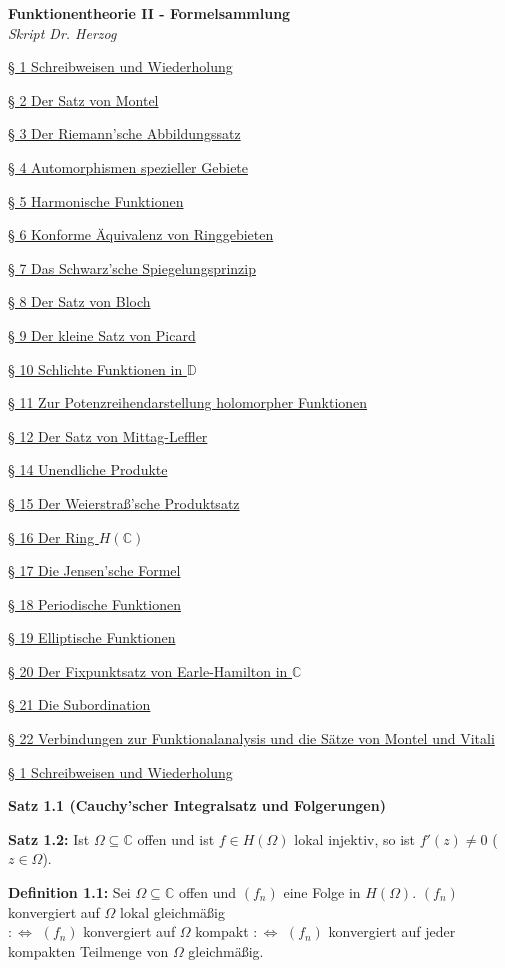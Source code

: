 \documentclass[11pt]{article}
\newcommand{\C}{\mathbb{C}}
\newcommand{\D}{\mathbb{D}}
\begin{document}
\begin{center}
{\Large \textbf{Funktionentheorie II - Formelsammlung}} \\
\textit{Skript Dr. Herzog}
\end{center}

\underline{§ 1 Schreibweisen und Wiederholung}

\underline{§ 2 Der Satz von Montel}

\underline{§ 3 Der Riemann'sche Abbildungssatz}

\underline{§ 4 Automorphismen spezieller Gebiete} 

\underline{§ 5 Harmonische Funktionen}

\underline{§ 6 Konforme Äquivalenz von Ringgebieten}

\underline{§ 7 Das Schwarz'sche Spiegelungsprinzip}

\underline{§ 8 Der Satz von Bloch}

\underline{§ 9 Der kleine Satz von Picard}

\underline{§ 10 Schlichte Funktionen in $\D$}

\underline{§ 11 Zur Potenzreihendarstellung holomorpher Funktionen}

\underline{§ 12 Der Satz von Mittag-Leffler}

\underline{§ 14 Unendliche Produkte}

\underline{§ 15 Der Weierstraß'sche Produktsatz}

\underline{§ 16 Der Ring $H(\C)$}

\underline{§ 17 Die Jensen'sche Formel}

\underline{§ 18 Periodische Funktionen}

\underline{§ 19 Elliptische Funktionen}

\underline{§ 20 Der Fixpunktsatz von Earle-Hamilton in $\C$}

\underline{§ 21 Die Subordination}

\underline{§ 22 Verbindungen zur Funktionalanalysis und die Sätze von Montel und Vitali}

\newpage

\underline{§ 1 Schreibweisen und Wiederholung}

\textbf{Satz 1.1 (Cauchy'scher Integralsatz und Folgerungen)}

\textbf{Satz 1.2:} Ist $\Omega \subseteq \C$ offen und ist $f \in H(\Omega)$ lokal injektiv, so ist $f'(z) \neq 0$ ($z \in \Omega$).

\textbf{Definition 1.1:} Sei $\Omega \subseteq \C$ offen und $(f_n)$ eine Folge in $H(\Omega)$. $(f_n)$ konvergiert auf $\Omega$ lokal gleichmäßig \\
$:\Leftrightarrow$ $(f_n)$ konvergiert auf $\Omega$ kompakt $:\Leftrightarrow$ $(f_n)$ konvergiert auf jeder kompakten Teilmenge von $\Omega$ gleichmäßig.
\end{document}
